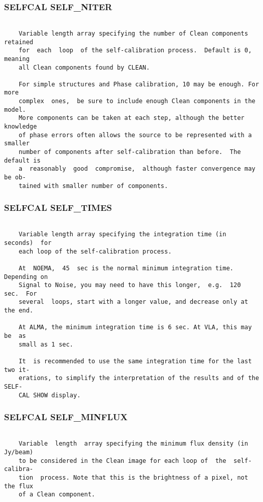 \subsubsection{SELFCAL SELF\_NITER}
\begin{verbatim}

    Variable length array specifying the number of Clean components retained
    for  each  loop  of the self-calibration process.  Default is 0, meaning
    all Clean components found by CLEAN.

    For simple structures and Phase calibration, 10 may be enough. For  more
    complex  ones,  be sure to include enough Clean components in the model.
    More components can be taken at each step, although the better knowledge
    of phase errors often allows the source to be represented with a smaller
    number of components after self-calibration than before.  The default is
    a  reasonably  good  compromise,  although faster convergence may be ob-
    tained with smaller number of components.

\end{verbatim}
\subsubsection{SELFCAL SELF\_TIMES}
\begin{verbatim}

    Variable length array specifying the integration time (in  seconds)  for
    each loop of the self-calibration process.

    At  NOEMA,  45  sec is the normal minimum integration time. Depending on
    Signal to Noise, you may need to have this longer,  e.g.  120  sec.  For
    several  loops, start with a longer value, and decrease only at the end.

    At ALMA, the minimum integration time is 6 sec. At VLA, this may  be  as
    small as 1 sec.

    It  is recommended to use the same integration time for the last two it-
    erations, to simplify the interpretation of the results and of the SELF-
    CAL SHOW display.

\end{verbatim}
\subsubsection{SELFCAL SELF\_MINFLUX}
\begin{verbatim}

    Variable  length  array specifying the minimum flux density (in Jy/beam)
    to be considered in the Clean image for each loop of  the  self-calibra-
    tion  process. Note that this is the brightness of a pixel, not the flux
    of a Clean component.

\end{verbatim}
